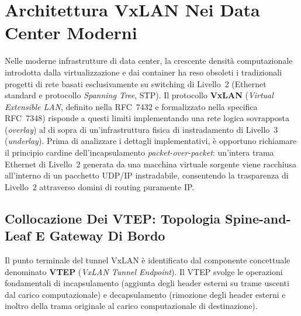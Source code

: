 \documentclass[11pt, a4paper]{article}
\begin{document}


\section{Architettura VxLAN Nei Data Center Moderni}

Nelle moderne infrastrutture di data center, la crescente densità computazionale introdotta dalla virtualizzazione e dai container ha reso obsoleti i tradizionali progetti di rete basati esclusivamente su switching di Livello~2 (Ethernet standard e protocollo \emph{Spanning Tree}, STP). Il protocollo \textbf{VxLAN} (\emph{Virtual Extensible LAN}, definito nella RFC~7432 e formalizzato nella specifica RFC~7348) risponde a questi limiti implementando una rete logica sovrapposta (\emph{overlay}) al di sopra di un'infrastruttura fisica di instradamento di Livello~3 (\emph{underlay}). Prima di analizzare i dettagli implementativi, è opportuno richiamare il principio cardine dell'incapsulamento \emph{packet-over-packet}: un'intera trama Ethernet di Livello~2 generata da una macchina virtuale sorgente viene racchiusa all'interno di un pacchetto UDP/IP instradabile, consentendo la trasparenza di Livello~2 attraverso domini di routing puramente IP.

\subsection{Collocazione Dei VTEP: Topologia Spine-and-Leaf E Gateway Di Bordo}

Il punto terminale del tunnel VxLAN è identificato dal componente concettuale denominato \textbf{VTEP} (\emph{VxLAN Tunnel Endpoint}). Il VTEP svolge le operazioni fondamentali di incapsulamento (aggiunta degli header esterni su trame uscenti dal carico computazionale) e decapsulamento (rimozione degli header esterni e inoltro della trama originale al carico computazionale di destinazione).
\end{document}
